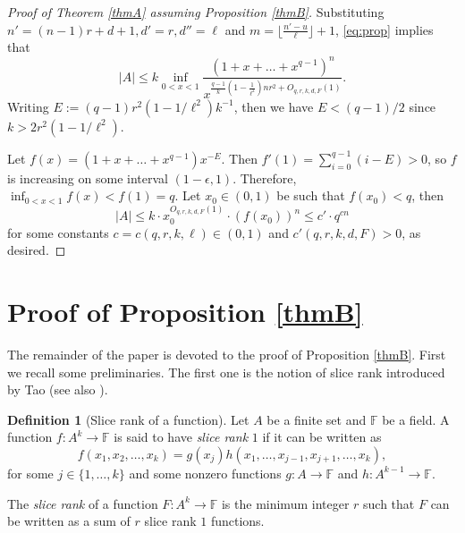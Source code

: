 \documentclass[11pt]{amsart}
\newcommand{\F}{\mathbb{F}}
\theoremstyle{definition}
\newtheorem{definition}[theorem]{Definition}
\theoremstyle{remark}
\newtheorem{example}{Example}
\begin{document}
\begin{proof}[Proof of Theorem \ref{thmA} assuming Proposition \ref{thmB}]
    
Substituting $n'= (n-1)r+d+1, d'=r, d''=\ell$ and $m = \lfloor {\frac{n'-u}{\ell}}\rfloor +1$, \eqref{eq:prop} implies that
\[
|A|\leq k \inf_{0<x<1}\frac{(1+x+\dots+x^{q-1})^n}{ x^{\frac{q-1}{k} \left( 1 - \frac{1}{\ell^2} \right) nr^2 + O_{q,r,k,d,F}(1) }}.
\]
Writing $E := (q-1)r^2(1-1/\ell^2)k^{-1}$, then we have $E <(q-1)/2$ since $k>2r^2(1-1/\ell^2)$.

Let $f(x) =(1+x+\dots+x^{q-1})x^{-E}$. Then $f'(1) = \sum_{i=0}^{q-1} (i-E) > 0$, so $f$ is increasing on some interval $(1-\epsilon,1)$. Therefore, $\inf_{0<x<1} f(x) < f(1) = q$. Let $x_0 \in (0,1)$ be such that $f(x_0) <q$, then
  \begin{equation*}
|A|  \leq k \cdot x_0^{O_{q,r,k,d,F}(1)} \cdot (f(x_0))^n \leq c' \cdot q^{cn} 
  \end{equation*}
for some constants $c = c(q,r,k,\ell) \in (0,1)$ and $c'(q,r,k,d,F) >0$, as desired.
\end{proof}



\section{Proof of Proposition \ref{thmB}} \label{sec:th}
The remainder of the paper is devoted to the proof of Proposition \ref{thmB}. First we recall some preliminaries. The first one is the notion of slice rank introduced by Tao \cite{tao} (see also \cite[Definition 6.5.2]{zhao}).
\begin{definition}[Slice rank of a function]\label{srank}
	Let $A$ be a finite set and $\F$ be a field. A function $f: A^k \rightarrow \F$ is said to have \textit{slice rank} $1$ if it can be written as  
	\begin{equation*}
		f(x_1,x_2, \dots,x_k )= g(x_j)h(x_1,\dots, x_{j-1},x_{j+1},\dots, x_k),
	\end{equation*}
	for some $j\in \{1, \ldots, k\}$ and some nonzero functions $g:A\rightarrow \F$ and $h:A^{k-1}\rightarrow\F$.
	
	The \textit{slice rank} of a function $F: A^k \rightarrow \F$ is the minimum integer $r$ such that $F$ can be written as a sum of $r$ slice rank $1$ functions.
\end{definition}
\end{document}
